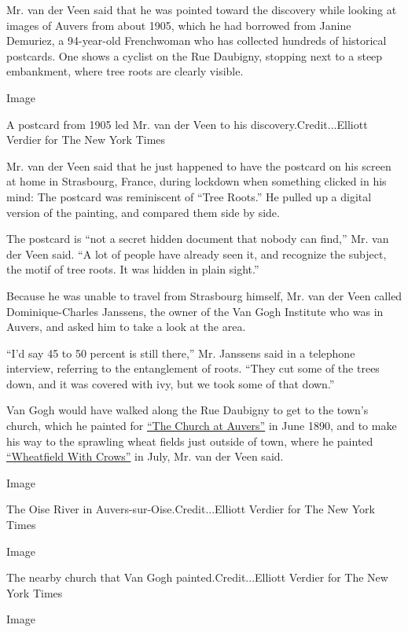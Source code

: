 Mr. van der Veen said that he was pointed toward the discovery while
looking at images of Auvers from about 1905, which he had borrowed from
Janine Demuriez, a 94-year-old Frenchwoman who has collected hundreds of
historical postcards. One shows a cyclist on the Rue Daubigny, stopping
next to a steep embankment, where tree roots are clearly visible.

Image

A postcard from 1905 led Mr. van der Veen to his
discovery.Credit...Elliott Verdier for The New York Times

Mr. van der Veen said that he just happened to have the postcard on his
screen at home in Strasbourg, France, during lockdown when something
clicked in his mind: The postcard was reminiscent of ``Tree Roots.'' He
pulled up a digital version of the painting, and compared them side by
side.

The postcard is ``not a secret hidden document that nobody can find,''
Mr. van der Veen said. ``A lot of people have already seen it, and
recognize the subject, the motif of tree roots. It was hidden in plain
sight.''

Because he was unable to travel from Strasbourg himself, Mr. van der
Veen called Dominique-Charles Janssens, the owner of the Van Gogh
Institute who was in Auvers, and asked him to take a look at the area.

``I'd say 45 to 50 percent is still there,'' Mr. Janssens said in a
telephone interview, referring to the entanglement of roots. ``They cut
some of the trees down, and it was covered with ivy, but we took some of
that down.''

Van Gogh would have walked along the Rue Daubigny to get to the town's
church, which he painted for
\href{https://www.musee-orsay.fr/en/collections/works-in-focus/painting/commentaire_id/the-church-in-auvers-sur-oise-7170.html?cHash=6d6ea9b5c1}{``The
Church at Auvers''} in June 1890, and to make his way to the sprawling
wheat fields just outside of town, where he painted
\href{https://www.vangoghmuseum.nl/en/collection/s0149V1962}{``Wheatfield
With Crows''} in July, Mr. van der Veen said.

Image

The Oise River in Auvers-sur-Oise.Credit...Elliott Verdier for The New
York Times

Image

The nearby church that Van Gogh painted.Credit...Elliott Verdier for The
New York Times

Image

